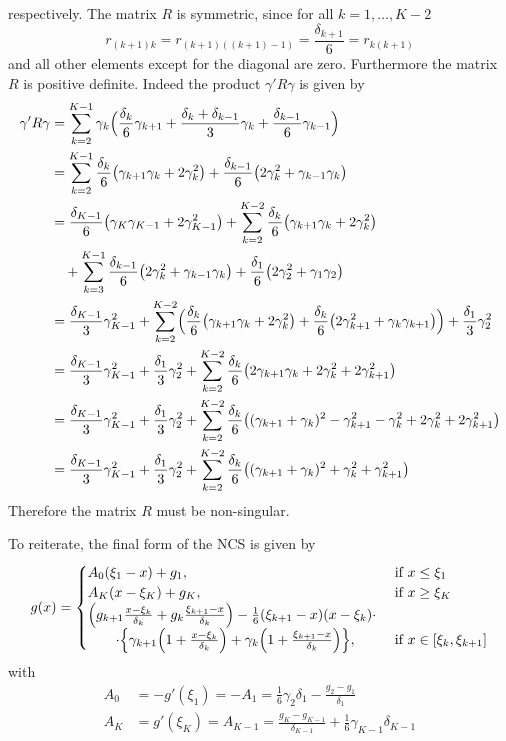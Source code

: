 \documentclass[a4paper]{article}
\begin{document}
respectively. The matrix $R$ is symmetric, since for all $k=1,\ldots, K-2$
\[
r_{(k+1)k}
= r_{(k+1)((k+1)-1)}
= \frac{\delta_{k+1}}{6}
= r_{k(k+1)}
\]
and all other elements except for the diagonal are zero. Furthermore the matrix
$R$ is positive definite. Indeed the product $\gamma'R\gamma$ is given by
\begin{align*}
\gamma'R\gamma
	&= \sum_{k=2}^{K-1} \gamma_k\Bigl( \frac{\delta_k}{6} \gamma_{k+1} + \frac{\delta_k+\delta_{k-1}}{3} \gamma_k + \frac{\delta_{k-1}}{6}\gamma_{k-1} \Bigr)\\
	&= \sum_{k=2}^{K-1} \frac{\delta_k}{6} \bigl(\gamma_{k+1}\gamma_k + 2 \gamma_k^2\bigr)
		+ \frac{\delta_{k-1}}{6} \bigl( 2\gamma_k^2 + \gamma_{k-1}\gamma_k \bigr)\\
	&= \frac{\delta_{K-1}}{6} \bigl(\gamma_K\gamma_{K-1} + 2 \gamma_{K-1}^2\bigr)
		+ \sum_{k=2}^{K-2} \frac{\delta_k}{6} \bigl(\gamma_{k+1}\gamma_k + 2 \gamma_k^2\bigr) \\
	&\quad + \sum_{k=3}^{K-1} \frac{\delta_{k-1}}{6} \bigl( 2\gamma_k^2 + \gamma_{k-1}\gamma_k \bigr)
		+ \frac{\delta_1}{6} \bigl( 2\gamma_2^2 + \gamma_1\gamma_2 \bigr)\\
	&= \frac{\delta_{K-1}}{3} \gamma_{K-1}^2
		+ \sum_{k=2}^{K-2} \Bigl( \frac{\delta_k}{6} \bigl(\gamma_{k+1}\gamma_k + 2 \gamma_k^2\bigr)
			+ \frac{\delta_k}{6} \bigl( 2\gamma_{k+1}^2 + \gamma_k\gamma_{k+1} \bigr)\Bigr)
		+ \frac{\delta_1}{3}\gamma_2^2\\
	&= \frac{\delta_{K-1}}{3} \gamma_{K-1}^2 + \frac{\delta_1}{3}\gamma_2^2
		+ \sum_{k=2}^{K-2} \frac{\delta_k}{6} \bigl(2\gamma_{k+1}\gamma_k + 2 \gamma_k^2 + 2\gamma_{k+1}^2\bigr)\\
	&= \frac{\delta_{K-1}}{3} \gamma_{K-1}^2 + \frac{\delta_1}{3}\gamma_2^2
		+ \sum_{k=2}^{K-2} \frac{\delta_k}{6} \bigl((\gamma_{k+1}+\gamma_k)^2 -\gamma_{k+1}^2 - \gamma_k^2 + 2 \gamma_k^2 + 2\gamma_{k+1}^2\bigr)\\
	&= \frac{\delta_{K-1}}{3} \gamma_{K-1}^2 + \frac{\delta_1}{3}\gamma_2^2
		+ \sum_{k=2}^{K-2} \frac{\delta_k}{6} \bigl((\gamma_{k+1}+\gamma_k)^2 + \gamma_k^2 + \gamma_{k+1}^2\bigr)
\end{align*}
Therefore the matrix $R$ must be non-singular.

\noindent To reiterate, the final form of the NCS is given by
\[
g(x) = \begin{cases}
	A_0(\xi_1-x)+g_1, &\text{ if }x \leq \xi_1\\
	A_K(x-\xi_K)+g_K, &\text{ if }x \geq \xi_K\\
	\Bigl(
		g_{k+1} \frac{x - \xi_k}{\delta_k} + g_k \frac{\xi_{k+1}-x}{\delta_k}
	\Bigr) - \frac{1}{6} (\xi_{k+1}-x)(x-\xi_k) \cdot\\
	\quad\quad\cdot \Bigl\{
		\gamma_{k+1}\Bigl(1+\frac{x-\xi_k}{\delta_k}\Bigr)
		+\gamma_k\Bigl(1+\frac{\xi_{k+1}-x}{\delta_k}\Bigr)
	\Bigr\}, &\text{ if } x\in [\xi_k,\xi_{k+1}]
\end{cases}
\]
with
\begin{align*}
	A_0 &= -g'(\xi_1) = - A_1 =  \frac{1}{6} \gamma_2 \delta_1 - \frac{g_2 - g_1}{\delta_1}\\
	A_K &= g'(\xi_K) = A_{K-1} = \frac{g_K - g_{K-1}}{\delta_{K-1}} + \frac{1}{6} \gamma_{K-1} \delta_{K-1}
\end{align*}
\end{document}
